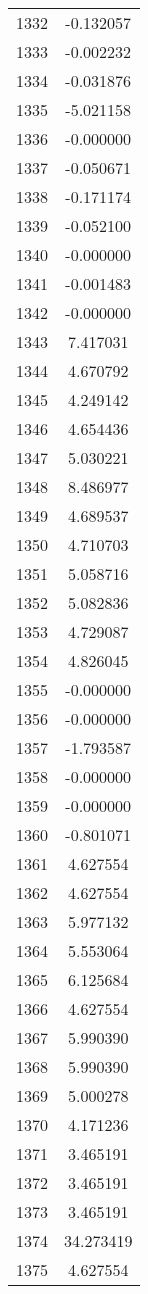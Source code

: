 \documentclass[12pt]{article}
\begin{document}
\begin{longtable}{@{}cc@{}}
1332 & -0.132057 \\
1333 & -0.002232 \\
1334 & -0.031876 \\
1335 & -5.021158 \\
1336 & -0.000000 \\
1337 & -0.050671 \\
1338 & -0.171174 \\
1339 & -0.052100 \\
1340 & -0.000000 \\
1341 & -0.001483 \\
1342 & -0.000000 \\
1343 & 7.417031 \\
1344 & 4.670792 \\
1345 & 4.249142 \\
1346 & 4.654436 \\
1347 & 5.030221 \\
1348 & 8.486977 \\
1349 & 4.689537 \\
1350 & 4.710703 \\
1351 & 5.058716 \\
1352 & 5.082836 \\
1353 & 4.729087 \\
1354 & 4.826045 \\
1355 & -0.000000 \\
1356 & -0.000000 \\
1357 & -1.793587 \\
1358 & -0.000000 \\
1359 & -0.000000 \\
1360 & -0.801071 \\
1361 & 4.627554 \\
1362 & 4.627554 \\
1363 & 5.977132 \\
1364 & 5.553064 \\
1365 & 6.125684 \\
1366 & 4.627554 \\
1367 & 5.990390 \\
1368 & 5.990390 \\
1369 & 5.000278 \\
1370 & 4.171236 \\
1371 & 3.465191 \\
1372 & 3.465191 \\
1373 & 3.465191 \\
1374 & 34.273419 \\
1375 & 4.627554 \\

\end{longtable}
\end{document}
